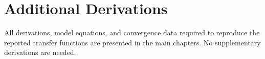 \documentclass[12pt,oneside]{book}
\begin{document}
\renewcommand{\bibname}{References}



\appendix
\chapter{Additional Derivations}
\label{app:derivations}
All derivations, model equations, and convergence data required to reproduce the reported transfer functions are presented in the main chapters. No supplementary derivations are needed.
\end{document}
